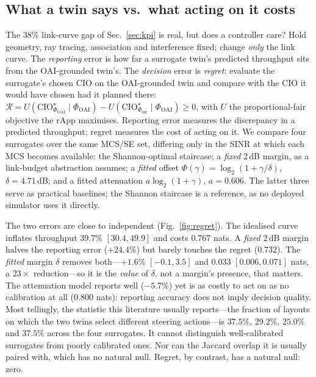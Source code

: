 \documentclass[conference]{IEEEtran}
\begin{document}
\subsection{What a twin says vs.\ what acting on it costs}
\label{sec:regret}
The 38\% link-curve gap of Sec.~\ref{sec:kpi} is real, but does a controller care? Hold geometry, ray tracing, association and interference fixed; change \emph{only} the link curve. The \emph{reporting} error is how far a surrogate twin's predicted throughput sits from the OAI-grounded twin's. The \emph{decision} error is \emph{regret}: evaluate the surrogate's chosen CIO on the OAI-grounded twin and compare with the CIO it would have chosen had it planned there: $\mathcal{R} = U(\mathrm{CIO}^{\star}_{\Phi_{\mathrm{OAI}}} \mid \Phi_{\mathrm{OAI}}) - U(\mathrm{CIO}^{\star}_{\Phi_{\mathrm{sur}}} \mid \Phi_{\mathrm{OAI}}) \ge 0$,
with $U$ the proportional-fair objective the rApp maximises. Reporting error measures the discrepancy in a predicted throughput; regret measures the cost of acting on it. We compare four surrogates over the same MCS/SE set, differing only in the SINR at which each MCS becomes available: the Shannon-optimal staircase; a \emph{fixed} $2$\,dB margin, as a link-budget abstraction assumes; a \emph{fitted} offset $\Phi(\gamma)=\log_2(1+\gamma/\delta)$, $\delta=4.71$\,dB; and a fitted attenuation $a\log_2(1+\gamma)$, $a=0.606$. The latter three serve as practical baselines; the Shannon staircase is a reference, as no deployed simulator uses it directly.

The two errors are close to independent (Fig.~\ref{fig:regret}). The idealised curve inflates throughput $39.7\%$ $[30.4, 49.9]$ and costs $0.767$ nats. A \emph{fixed} $2$\,dB margin halves the reporting error ($+24.4\%$) but barely touches the regret ($0.732$). The \emph{fitted} margin $\delta$ removes both---$+1.6\%$ $[-0.1, 3.5]$ and $0.033$ $[0.006, 0.071]$ nats, a $23\times$ reduction---so it is the \emph{value} of $\delta$, not a margin's presence, that matters. The attenuation model reports well ($-5.7\%$) yet is as costly to act on as no calibration at all ($0.800$ nats): reporting accuracy does not imply decision quality. Most tellingly, the statistic this literature usually reports---the fraction of layouts on which the two twins select different steering actions---is $37.5\%$, $29.2\%$, $25.0\%$ and $37.5\%$ across the four surrogates. It cannot distinguish well-calibrated surrogates from poorly calibrated ones. Nor can the Jaccard overlap it is usually paired with, which has no natural null. Regret, by contrast, has a natural null: zero.
\end{document}
